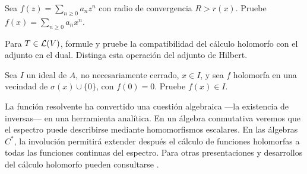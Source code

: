 \begin{ejercicio}\label{ej:v3-l23-5}
Sea $f(z)=\sum_{n\ge0}a_nz^n$ con radio de convergencia $R>r(x)$. Pruebe $f(x)=\sum_{n\ge0}a_nx^n$.
\end{ejercicio}


\begin{ejercicio}\label{ej:v3-l23-6}
Para $T\in\mathcal L(V)$, formule y pruebe la compatibilidad del cálculo holomorfo con el adjunto en el dual. Distinga esta operación del adjunto de Hilbert.
\end{ejercicio}


\begin{ejercicio}\label{ej:v3-l23-7}
Sea $I$ un ideal de $A$, no necesariamente cerrado, $x\in I$, y sea $f$ holomorfa en una vecindad de $\sigma(x)\cup\{0\}$, con $f(0)=0$. Pruebe $f(x)\in I$.
\end{ejercicio}


La función resolvente ha convertido una cuestión algebraica ---la existencia de inversas--- en una herramienta analítica. En un álgebra conmutativa veremos que el espectro puede describirse mediante homomorfismos escalares. En las álgebras $C^*$, la involución permitirá extender después el cálculo de funciones holomorfas a todas las funciones continuas del espectro. Para otras presentaciones y desarrollos del cálculo holomorfo pueden consultarse \cite{conway1990,rudin1991,murphy1990}.
